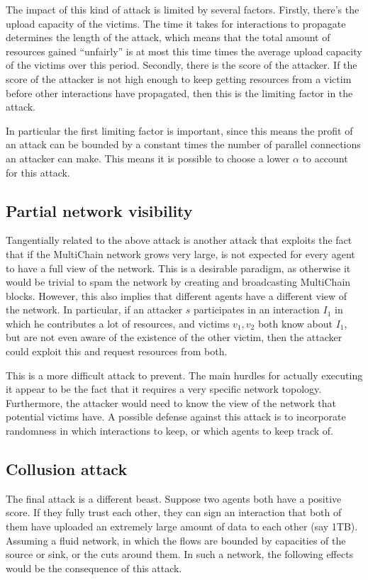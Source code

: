 \documentclass[a4paper,11pt]{book}
\theoremstyle{definition}
\begin{document}
The impact of this kind of attack is limited by several factors. Firstly, there's the upload capacity of the
victims. The time it takes for interactions to propagate determines the length of the attack, which means that
the total amount of resources gained ``unfairly'' is at most this time times the average upload capacity of
the victims over this period. Secondly, there is the score of the attacker. If the score of the attacker is
not high enough to keep getting resources from a victim before other interactions have propagated, then this
is the limiting factor in the attack. 

In particular the first limiting factor is important, since this means the profit of an attack can be bounded
by a constant times the number of parallel connections an attacker can make. This means it is possible
to choose a lower $\alpha$ to account for this attack. 

\subsection{Partial network visibility}

Tangentially related to the above attack is another attack that exploits the fact that if the MultiChain
network grows very large, is not expected for every agent to have a full view of the network. This
is a desirable paradigm, as otherwise it would be trivial to spam the network by creating and broadcasting
MultiChain blocks. However, this also implies that different agents have a different view of the network.
In particular, if an attacker $s$ participates in an interaction $I_1$ in which he contributes a lot
of resources, and victims $v_1, v_2$ both know about $I_1$, but are not even aware of the existence of
the other victim, then the attacker could exploit this and request resources from both. 

This is a more difficult attack to prevent. The main hurdles for actually executing it appear to be
the fact that it requires a very specific network topology. Furthermore, the attacker would need to
know the view of the network that potential victims have. A possible defense against this attack is
to incorporate randomness in which interactions to keep, or which agents to keep track of.

\subsection{Collusion attack}

The final attack is a different beast. Suppose two agents both have a positive score. If they 
fully trust each other, they can sign an interaction that both of them have uploaded an extremely large
amount of data to each other (say 1TB). Assuming a fluid network,
in which the flows are bounded by capacities of the source or sink, or the cuts around them.
In such a network, the following effects would be the consequence of this attack.
\end{document}
